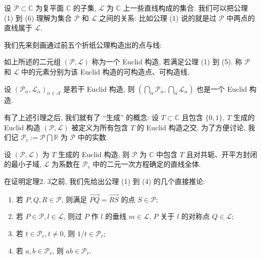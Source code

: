 设 $\mathcal{P}\subset\mathbb{C}$ 为复平面 $\mathbb{C}$ 的子集, 
$\mathcal{L}$ 为 $\mathbb{C}$ 上一些直线构成的集合. 
我们可以把公理 (1) 到 (6) 理解为集合 $\mathcal{P}$ 和 $\mathcal{L}$ 之间的关系: 
比如公理 (1) 说的就是过 $\mathcal{P}$ 中两点的直线属于 $\mathcal{L}$. 

我们先来刻画通过前五个折纸公理构造出的点与线: 

\begin{definition}
    如上所述的二元组 $(\mathcal{P},\mathcal{L})$ 称为一个 Euclid 构造, 若满足公理 (1) 到 (5). 
    称 $\mathcal{P}$ 和 $\mathcal{L}$ 中的元素分别为该 Euclid 构造的可构造点、可构造线. 
\end{definition}

\begin{lemma}
    设 $(\mathcal{P}_\alpha,\mathcal{L}_\alpha)_{\alpha\in\mathcal{A}}$ 是若干 Euclid 构造, 
    则 $(\bigcap_\alpha \mathcal{P}_\alpha,\bigcap_\alpha \mathcal{L}_\alpha)$ 也是一个 Euclid 构造. 
\end{lemma}

有了上述引理之后, 我们就有了 ``生成'' 的概念: 
设 $T\subset\mathbb{C}$ 且包含 $\{0,1\}$, 
$T$ 生成的 Euclid 构造 $(\mathcal{P},\mathcal{L})$ 被定义为所有包含 $T$ 的 Euclid 构造之交. 
为了方便讨论, 我们记 $\mathcal{P}_r:=\mathcal{P}\bigcap\mathbb{R}$ 为 $\mathcal{P}$ 中的实数. 

\begin{theorem}
    设 $(\mathcal{P},\mathcal{L})$ 为 $T$ 生成的 Euclid 构造, 
    则 $\mathcal{P}$ 为 $\mathbb{C}$ 中包含 $T$ 且对共轭、开平方封闭的最小子域, 
    $\mathcal{L}$ 为系数在 $\mathcal{P}_r$ 中的二元一次方程确定的直线全体. 
\end{theorem}

在证明定理2. 3之前, 我们先给出公理 (1) 到 (4) 的几个直接推论: 

\begin{enumerate}[wide,itemindent=2em,label=(\alph*)]
\item 若 $P,Q,R\in\mathcal{P}$, 则满足 $\overrightarrow{PQ}=\overrightarrow{RS}$ 的点 $S\in\mathcal{P}$;
\item 若 $P\in\mathcal{P},l\in\mathcal{L}$, 则过 $P$ 作 $l$ 的垂线 $m\in\mathcal{L}$, $P$ 关于 $l$ 的对称点 $Q\in\mathcal{L}$;
\item 若 $t\in\mathcal{P}_r,t\neq 0$, 则 $1/t\in\mathcal{P}_r$;
\item 若 $a,b\in\mathcal{P}_r$, 则 $ab\in\mathcal{P}_r$. 
\end{enumerate}

